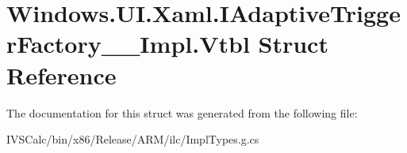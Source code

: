 \hypertarget{struct_windows_1_1_u_i_1_1_xaml_1_1_i_adaptive_trigger_factory_____impl_1_1_vtbl}{}\section{Windows.\+U\+I.\+Xaml.\+I\+Adaptive\+Trigger\+Factory\+\_\+\+\_\+\+Impl.\+Vtbl Struct Reference}
\label{struct_windows_1_1_u_i_1_1_xaml_1_1_i_adaptive_trigger_factory_____impl_1_1_vtbl}


The documentation for this struct was generated from the following file\+:\begin{DoxyCompactItemize}
\item 
I\+V\+S\+Calc/bin/x86/\+Release/\+A\+R\+M/ilc/Impl\+Types.\+g.\+cs\end{DoxyCompactItemize}
